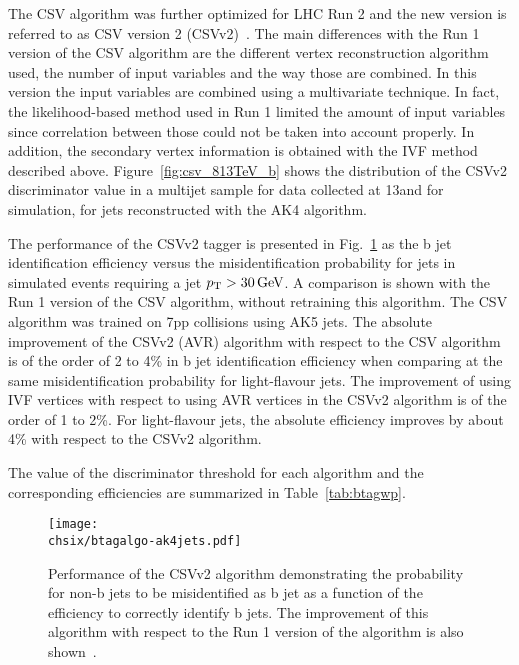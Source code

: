 The CSV algorithm was further optimized for LHC Run 2 and the new version is referred to as CSV version 2 (CSVv2)~\cite{CMS-PAS-BTV-15-001}. The main differences with the Run 1 version of the CSV algorithm are the different vertex reconstruction algorithm used, the number of input variables and the way those are combined. In this version the input variables are combined using a multivariate technique. In fact, the likelihood-based method used in Run 1 limited the amount of input variables since correlation between those could not be taken into account properly. In addition, the secondary vertex information is obtained with the IVF method described above. Figure~\ref{fig:csv_813TeV_b} shows the distribution of the CSVv2 discriminator value in a multijet sample for data collected at 13\TeV and for simulation, for jets reconstructed with the AK4 algorithm.

The performance of the CSVv2 tagger is presented in Fig.~\ref{fig:btagalgo} as the b jet identification efficiency versus the misidentification probability for jets in simulated \ttbar events requiring a jet $p_{\mathrm{T}} > 30\,\text{Ge\hspace{-.08em}V}$. A comparison is shown with the Run 1 version of the CSV algorithm, without retraining this algorithm. The CSV algorithm was trained on 7\TeV pp collisions using AK5 jets. The absolute improvement of the CSVv2 (AVR) algorithm with respect to the CSV algorithm is of the order of 2 to 4\% in b jet identification efficiency when comparing at the same misidentification probability for light-flavour jets. The improvement of using IVF vertices with respect to using AVR vertices in the CSVv2 algorithm is of the order of 1 to 2\%. For light-flavour jets, the absolute efficiency improves by about 4\% with respect to the CSVv2 algorithm.

The value of the discriminator threshold for each algorithm and the corresponding efficiencies are summarized in Table~\ref{tab:btagwp}.

\begin{figure}[!htb]
 \begin{center}
  \texttt{[image: \\chsix/btagalgo-ak4jets.pdf]}
 \end{center}
 \caption{Performance of the CSVv2 algorithm demonstrating the probability for non-b jets to be misidentified as b jet as a function of the efficiency to correctly identify b jets. The improvement of this algorithm with respect to the Run 1 version of the algorithm is also shown~\cite{CMS-PAS-BTV-15-001}.}
 \label{fig:btagalgo}
\end{figure}


